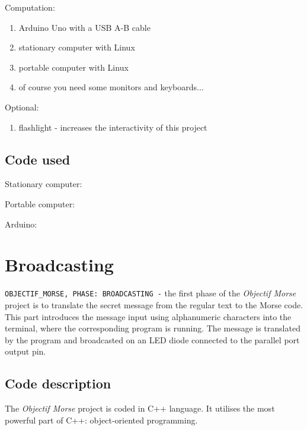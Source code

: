 \documentclass[12pt]{report}
\begin{document}
Computation:

\begin{enumerate}

\item Arduino Uno with a USB A-B cable
\item stationary computer with Linux
\item portable computer with Linux
\item of course you need some monitors and keyboards...

\end{enumerate}

Optional:

\begin{enumerate}

\item flashlight - increases the interactivity of this project

\end{enumerate}

\section{Code used}

Stationary computer:



Portable computer:




Arduino:



\newpage

\chapter{Broadcasting}

\verb|OBJECTIF_MORSE, PHASE: BROADCASTING -| the first phase of the \textit{Objectif Morse} project is to translate the secret message from the regular text to the Morse code. This part introduces the message input using alphanumeric characters into the terminal, where the corresponding program is running. The message is translated by the program and broadcasted on an LED diode connected to the parallel port output pin.

\section{Code description}

The \textit{Objectif Morse} project is coded in C++ language. It utilises the most powerful part of C++: object-oriented programming.
\end{document}
